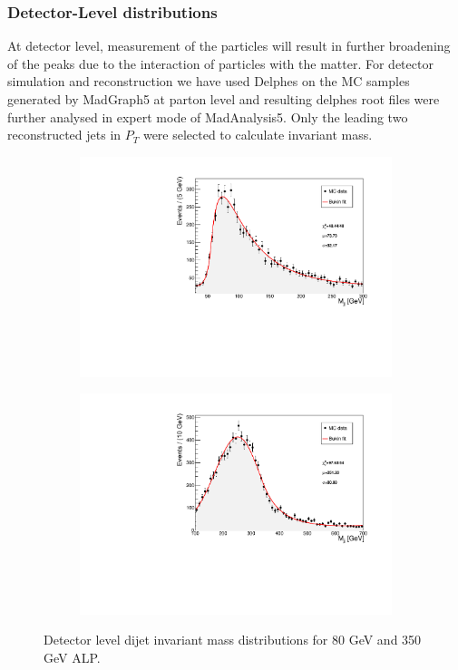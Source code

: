 \documentclass[12pt,a4paper]{article}
\begin{document}
\pagebreak

\subsubsection{Detector-Level distributions}
At detector level, measurement of the particles will result in further broadening of the peaks due to the interaction of particles with the matter. For detector simulation and reconstruction we have used Delphes on the MC samples generated by MadGraph5 at parton level and resulting delphes root files were further analysed in expert mode of MadAnalysis5. Only the  leading two reconstructed jets in $P_T$ were selected to calculate invariant mass.

\begin{figure}[h!]
	\begin{subfigure}{7.4cm}
	\centering\includegraphics[scale=0.4]{detector_level_80_fit.pdf}
	\end{subfigure}
	\begin{subfigure}{7.4cm}
	\centering\includegraphics[scale=0.4]{detector_level_350_fit.pdf}
	\end{subfigure}
\caption{Detector level dijet invariant mass distributions for 80 GeV and 350 GeV ALP.}
\label{fig:figure7}	
\end{figure}
\end{document}
